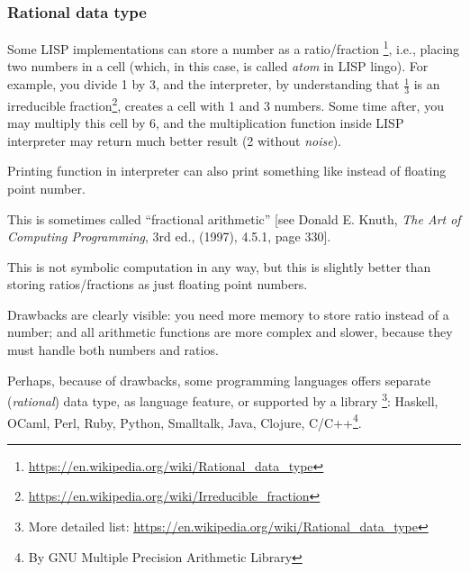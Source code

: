 \subsubsection{Rational data type}

Some LISP implementations can store a number as a ratio/fraction
\footnote{\url{https://en.wikipedia.org/wiki/Rational_data_type}}, i.e., placing two numbers in a cell (which, in this case, is called \textit{atom} in LISP lingo).
For example, you divide 1 by 3, and the interpreter, by understanding that $\frac{1}{3}$ is 
an irreducible fraction\footnote{\url{https://en.wikipedia.org/wiki/Irreducible_fraction}}, creates a cell with 1 and 3 numbers.
Some time after, you may multiply this cell by 6, and the multiplication function inside LISP interpreter may return much better result (2 without \textit{noise}).

Printing function in interpreter can also print something like  instead of floating point number.

This is sometimes called ``fractional arithmetic'' [see Donald E. Knuth, \textit{The Art of Computing Programming}, 3rd ed., (1997), 4.5.1, page 330].

This is not symbolic computation in any way, but this is slightly better than storing ratios/fractions as just floating point numbers.

Drawbacks are clearly visible: you need more memory to store ratio instead of a number;
and all arithmetic functions are more complex and slower, because they must handle both numbers and ratios.

Perhaps, because of drawbacks, some programming languages offers separate (\textit{rational}) data type, as language feature, or supported by a library
\footnote{More detailed list: \url{https://en.wikipedia.org/wiki/Rational_data_type}}:
Haskell, OCaml, Perl, Ruby, Python, Smalltalk, Java, Clojure, C/C++\footnote{By GNU Multiple Precision Arithmetic Library}.

